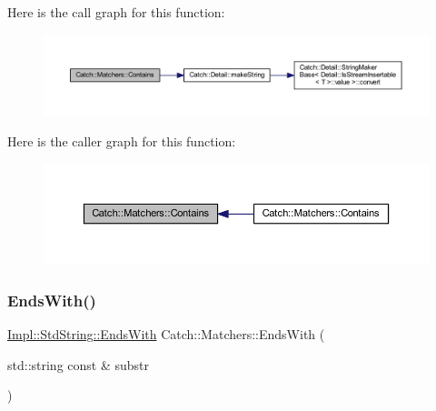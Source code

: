 Here is the call graph for this function\+:\nopagebreak
\begin{figure}[H]
\begin{center}
\leavevmode
\includegraphics[width=350pt]{namespace_catch_1_1_matchers_a7bc27b5c696118cbe54690d6c524b3d9_cgraph}
\end{center}
\end{figure}
Here is the caller graph for this function\+:\nopagebreak
\begin{figure}[H]
\begin{center}
\leavevmode
\includegraphics[width=350pt]{namespace_catch_1_1_matchers_a7bc27b5c696118cbe54690d6c524b3d9_icgraph}
\end{center}
\end{figure}
\hypertarget{namespace_catch_1_1_matchers_a1e32a2d23a1eb9eda9840c712c7b00c1}{}\label{namespace_catch_1_1_matchers_a1e32a2d23a1eb9eda9840c712c7b00c1} 
\subsubsection{\texorpdfstring{Ends\+With()}{EndsWith()}\hspace{0.1cm}{\footnotesize\ttfamily [1/2]}}
{\footnotesize\ttfamily \hyperlink{struct_catch_1_1_matchers_1_1_impl_1_1_std_string_1_1_ends_with}{Impl\+::\+Std\+String\+::\+Ends\+With} Catch\+::\+Matchers\+::\+Ends\+With (\begin{DoxyParamCaption}\item[{std\+::string const \&}]{substr }\end{DoxyParamCaption})\hspace{0.3cm}{\ttfamily [inline]}}

